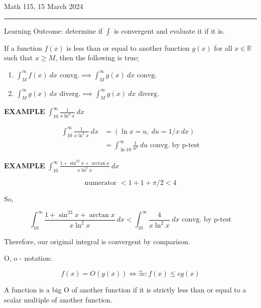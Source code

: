 \documentclass{article}
\begin{document}
Math 115, 15 March 2024
\hrule

\vspace{10pt}

Learning Outcome: determine if $\int$ is convergent and evaluate it if it is.

\vspace{10pt}

If a function $f(x)$ is less than or equal to another function $g(x)$ for all $x\in\mathbb{R}$ such that $x\geq M$, then the following is true;

\begin{center}
\begin{enumerate}[label=(\alph*)]
\item $\displaystyle\int_M^\infty f(x)\ dx\mbox{ convg.}\implies\int_M^\infty g(x)\ dx\mbox{ convg.}$
\item $\displaystyle\int_M^\infty g(x)\ dx\mbox{ diverg.}\implies\int_M^\infty g(x)\ dx\mbox{ diverg.}$
\end{enumerate}
\end{center}

\vspace{10pt}

{\bf{}EXAMPLE} $\displaystyle\int_{10}^\infty\frac{1}{x\ln^2x}\ dx$

\begin{align*}
\int_{10}^\infty\frac{1}{x\ln^2x}\ dx&=(\ln x=u,\ du=1/x\ dx)\\
&=\int_{\ln10}^\infty\frac{1}{u^2}\ du\mbox{ convg. by p-test}
\end{align*}

\vspace{10pt}

{\bf{}EXAMPLE} $\displaystyle\int_{10}^\infty\frac{1+\sin^23x+\arctan x}{x\ln^2x}\ dx$

\[\mbox{numerator }<1+1+\pi/2<4\]

So,

\[\int_{10}^\infty\frac{1+\sin^23x+\arctan x}{x\ln^2x}\ dx<\int_{10}^\infty\frac{4}{x\ln^2x}\ dx\mbox{ convg. by p-test}\]

Therefore, our original integral is convergent by comparison.

\vspace{10pt}

O, o - notation:

\[f(x)=O(g(x))\iff\exists c:f(x)\leq cg(x)\]

A function is a big O of another function if it is strictly less than or equal to a scalar multiple of another function.
\end{document}
